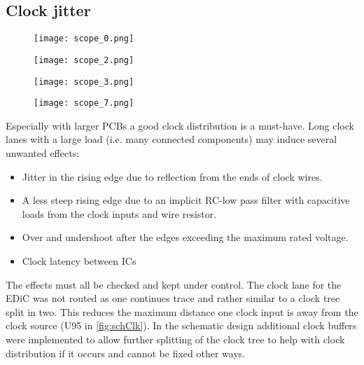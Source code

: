 \subsection{Clock jitter}
\begin{sidewaysfigure}[p]
  \centering
  \begin{subfigure}[b]{.45\textwidth}
    \texttt{[image: scope\_0.png]}
    \label{fig:clkDefault}
  \end{subfigure}%
  \hspace{.05\textwidth}
  \begin{subfigure}[b]{.45\textwidth}
    \texttt{[image: scope\_2.png]}
    \label{fig:clk33Ohm}
  \end{subfigure}

  \begin{subfigure}[b]{.45\textwidth}
    \texttt{[image: scope\_3.png]}
    \label{fig:clkTerm}
  \end{subfigure}%
  \hspace{.05\textwidth}
  \begin{subfigure}[b]{.45\textwidth}
    \texttt{[image: scope\_7.png]}
    \label{fig:clkLatency}
  \end{subfigure}
  \caption[Comparison of the clock rising edge in different configurations.]{Comparison of the rising edge of the clock in different configurations. Yellow is measured close to the clock buffer and green in \cref{fig:clkLatency} is measured at the end of a clock lane (U204 pin 8).}
\end{sidewaysfigure}
Especially with larger \glspl{PCB} a good clock distribution is a must-have.
Long clock lanes with a large load (i.e. many connected components) may induce several unwanted effects:
\begin{itemize}
  \item Jitter in the rising edge due to reflection from the ends of clock wires.
  \item A less steep rising edge due to an implicit RC-low pass filter with capacitive loads from the clock inputs and wire resistor.
  \item Over and undershoot after the edges exceeding the maximum rated voltage.
  \item Clock latency between \glspl{IC}
\end{itemize}
The effects must all be checked and kept under control.
The clock lane for the \gls{EDiC} was not routed as one continues trace and rather similar to a clock tree split in two.
This reduces the maximum distance one clock input is away from the clock source (U95 in \cref{fig:schClk}).
In the schematic design additional clock buffers were implemented to allow further splitting of the clock tree to help with clock distribution if it occurs and cannot be fixed other ways.

